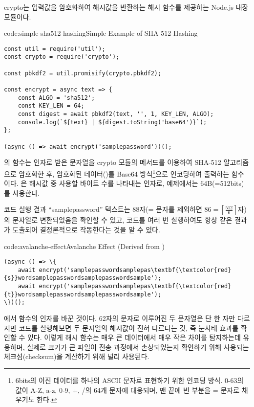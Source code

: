 crypto는 입력값을 암호화하여 해시값을 반환하는 해시 함수를 제공하는 Node.js 내장 모듈이다.

\begin{codeenv}{code:simple-sha512-hashing}{Simple Example of SHA-512 Hashing}\begin{verbatim}
const util = require('util');
const crypto = require('crypto');

const pbkdf2 = util.promisify(crypto.pbkdf2);

const encrypt = async text => {
    const ALGO = 'sha512';
    const KEY_LEN = 64;
    const digest = await pbkdf2(text, '', 1, KEY_LEN, ALGO);
    console.log(`${text} | ${digest.toString('base64')}`);
};

(async () => await encrypt('samplepassword'))();
\end{verbatim}
\end{codeenv}

의  함수는 인자로 받은 문자열을 crypto 모듈의  메서드를 이용하여 SHA-512 알고리즘으로 암호화한 후, 암호화된 데이터()를 Base64 방식\footnote{6bits의 이진 데이터를 하나의 ASCII 문자로 표현하기 위한 인코딩 방식. 0-63의 값이 A-Z, a-z, 0-9, +, /의 64개 문자에 대응되며, 맨 끝에 빈 부분을 = 문자로 채우기도 한다.}으로 인코딩하여 출력하는 함수이다. 은 해시값 중 사용할 바이트 수를 나타내는 인자로, 예제에서는 64B(=512bits)를 사용한다.

코드 실행 결과 ``samplepassword'' 텍스트는 88자(= 문자를 제외하면 $86=\left\lceil\frac{512}{6}\right\rceil$자)의 문자열로 변환되었음을 확인할 수 있고, 코드를 여러 번 실행하여도 항상 같은 결과가 도출되어 결정론적으로 작동한다는 것을 알 수 있다.

\begin{codeenv}{code:avalanche-effect}{Avalanche Effect (Derived from )}
\begin{Verbatim}[commandchars=\\\{\}]
(async () => \{
    await encrypt('samplepasswordsamplepas\textbf{\textcolor{red}{s}}wordsamplepasswordsamplepasswordsample');
    await encrypt('samplepasswordsamplepas\textbf{\textcolor{red}{t}}wordsamplepasswordsamplepasswordsample');
\})();
\end{Verbatim}
\end{codeenv}

\는 에서  함수의 인자를 바꾼 것이다. 62자의 문자로 이루어진 두 문자열은 단 한 자만 다르지만 코드를 실행해보면 두 문자열의 해시값이 전혀 다르다는 것, 즉 눈사태 효과를 확인할 수 있다. 이렇게 해시 함수는 매우 큰 데이터에서 매우 작은 차이를 탐지하는데 유용하며, 실제로 크기가 큰 파일이 전송 과정에서 손상되었는지 확인하기 위해 사용되는 체크섬(checksum)을 계산하기 위해 널리 사용된다.

